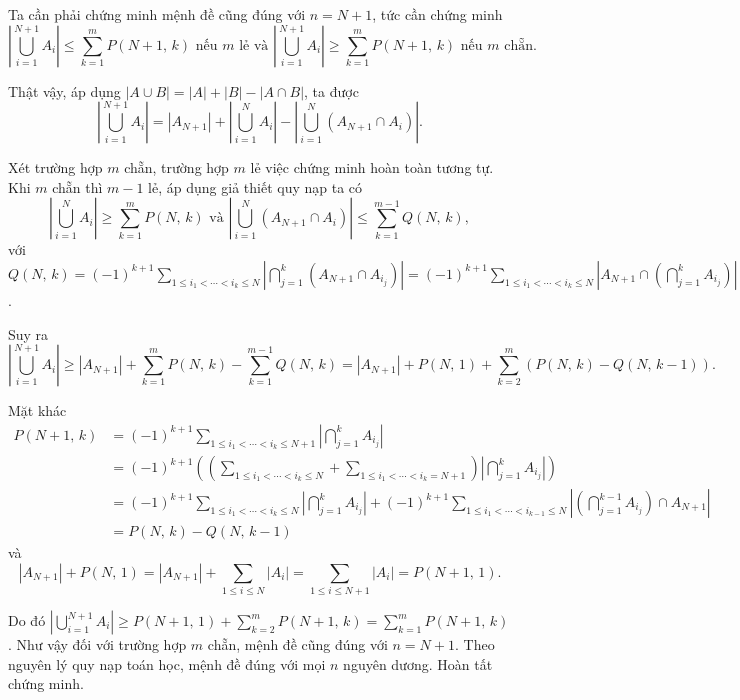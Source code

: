\begin{enumerate}
{        Ta cần phải chứng minh mệnh đề cũng đúng với $n = N+1$, tức cần chứng minh 
        $$\left|\bigcup\limits_{i = 1}^{N+1} A_i\right| \leq \sum\limits_{k = 1}^m P(N+1,\,k) \text{ nếu $m$ lẻ và }\left|\bigcup\limits_{i = 1}^{N+1} A_i\right| \geq \sum\limits_{k = 1}^m P(N+1,\,k) \text{ nếu $m$ chẵn}.$$

        Thật vậy, áp dụng $|A \cup B| = |A| + |B| - |A \cap B|$, ta được 
        $$\left|\bigcup\limits_{i = 1}^{N+1} A_i\right| = \left|A_{N+1}\right| + \left|\bigcup\limits_{i = 1}^{N} A_i\right| - \left|\bigcup\limits_{i = 1}^{N} (A_{N+1} \cap A_i)\right|.$$

        Xét trường hợp $m$ chẵn, trường hợp $m$ lẻ việc chứng minh hoàn toàn tương tự. Khi $m$ chẵn thì $m-1$ lẻ, áp dụng giả thiết quy nạp ta có 
        $$\left|\bigcup\limits_{i = 1}^{N} A_i\right| \geq \sum\limits_{k = 1}^m P(N,\,k) \text{ và } \left|\bigcup\limits_{i = 1}^{N} (A_{N+1} \cap A_i)\right| \leq \sum\limits_{k = 1}^{m-1} Q(N,\,k),$$
        với $\displaystyle Q(N,\,k) = (-1)^{k+1}\sum\limits_{1 \leq i_1 < \cdots < i_k \leq N} \left|\bigcap\limits_{j=1}^k \left(A_{N+1} \cap A_{i_j}\right)\right| = \displaystyle (-1)^{k+1}\sum\limits_{1 \leq i_1 < \cdots < i_k \leq N} \left|A_{N+1} \cap \left(\bigcap\limits_{j=1}^k A_{i_j}\right)\right|$.

        Suy ra $$\left|\bigcup\limits_{i = 1}^{N+1} A_i\right| \geq \left|A_{N+1}\right| + \sum\limits_{k = 1}^m P(N,\,k) - \sum\limits_{k = 1}^{m-1} Q(N,\,k) = \left|A_{N+1}\right| + P(N,\,1) + \sum\limits_{k = 2}^m\left(P(N,\,k) - Q(N,\,k-1)\right).$$

        Mặt khác
        \begin{align*}
            P(N+1,\,k) 
            &= (-1)^{k+1}\sum\limits_{1 \leq i_1 < \cdots < i_k \leq N+1} \left|\bigcap\limits_{j=1}^k A_{i_j} \right| \\
            &= (-1)^{k+1} \left(\left(\sum\limits_{1 \leq i_1 < \cdots < i_k \leq N} + \sum\limits_{1 \leq i_1 < \cdots < i_k = N+1}\right)\left|\bigcap\limits_{j=1}^k A_{i_j} \right|\right) \\
            &= (-1)^{k+1}\sum\limits_{1 \leq i_1 < \cdots < i_k \leq N}\left|\bigcap\limits_{j=1}^k A_{i_j} \right| + (-1)^{k+1}\sum\limits_{1 \leq i_1 < \cdots < i_{k-1} \leq N}\left|\left(\bigcap\limits_{j=1}^{k-1} A_{i_j}\right) \cap A_{N+1} \right| \\
            &= P(N,\,k) - Q(N,\,k-1)
        \end{align*} và 
        $$\left|A_{N+1}\right| + \displaystyle P(N,\,1) = \left|A_{N+1}\right| + \sum\limits_{1 \leq i \leq N} \left|A_{i}\right| = \sum\limits_{1 \leq i \leq N+1} \left|A_{i}\right| = P(N+1,\,1).$$

        Do đó $\displaystyle \left|\bigcup\limits_{i = 1}^{N+1} A_i\right| \geq P(N+1,\,1) + \sum\limits_{k = 2}^m P(N+1,\,k) = \sum\limits_{k = 1}^m P(N+1,\,k)$. Như vậy đối với trường hợp $m$ chẵn, mệnh đề cũng đúng với $n = N+1$. Theo nguyên lý quy nạp toán học, mệnh đề đúng với mọi $n$ nguyên dương. Hoàn tất chứng minh.
    }
\end{enumerate}

